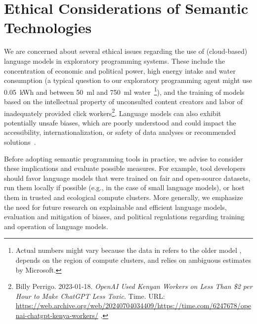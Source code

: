 
\section{Ethical Considerations of Semantic Technologies}
\label{sec:discussion/ethics}

We are concerned about several ethical issues regarding the use of (cloud-based) language models in exploratory programming systems.
These include the concentration of economic and political power, high energy intake and water consumption (a typical question to our exploratory programming agent might use \qty{0.05}{kWh} and between \qty{50}{ml} and \qty{750}{ml} water~\cite{li2023making}\footnote{%
	Actual numbers might vary because the data in \cite{li2023making} refers to the older model \gptthree, depends on the region of compute clusters, and relies on ambiguous estimates by Microsoft.
}), and the training of models based on the intellectual property of unconsulted content creators and labor of inadequately provided click workers\footnote{%
	Billy Perrigo.
	2023-01-18.
	\emph{OpenAI Used Kenyan Workers on Less Than \$2 per Hour to Make ChatGPT Less Toxic.}
	Time.
	URL:
	\url{https://web.archive.org/web/20240704034409/https://time.com/6247678/openai-chatgpt-kenya-workers/}%
	.
}.
Language models can also exhibit potentially unsafe biases, which are poorly understood and could impact the accessibility, internationalization, or safety of data analyses or recommended solutions~\cite{openai2024gpt4}.

Before adopting semantic programming tools in practice, we advise to consider these implications and evaluate possible measures.
For example, tool developers should favor language models that were trained on fair and open-source datasets, run them locally if possible (e.g., in the case of small language models), or host them in trusted and ecological compute clusters.
More generally, we emphasize the need for future research on explainable and efficient language models, evaluation and mitigation of biases, and political regulations regarding training and operation of language models.

